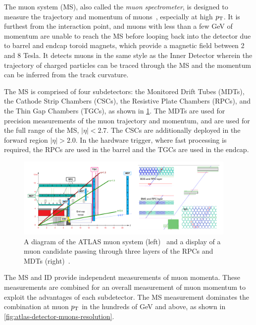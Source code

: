 The muon system (MS), also called the \textit{muon spectrometer}, is designed to measure the trajectory and momentum of muons~\cite{2010.muonspectrometer}, especially at high $p_{\mathrm{T}}$. It is furthest from the interaction point, and muons with less than a few GeV of momentum are unable to reach the MS before looping back into the detector due to barrel and endcap toroid magnets, which provide a magnetic field between 2 and 8 Tesla. It detects muons in the same style as the Inner Detector wherein the trajectory of charged particles can be traced through the MS and the momentum can be inferred from the track curvature.

The MS is comprised of four subdetectors: the Monitored Drift Tubes (MDTs), the Cathode Strip Chambers (CSCs), the Resistive Plate Chambers (RPCs), and the Thin Gap Chambers (TGCs), as shown in \cref{fig:atlas-detector-muons}. The MDTs are used for precision measurements of the muon trajectory and momentum, and are used for the full range of the MS, $|\eta| < 2.7$. The CSCs are additionally deployed in the forward region $|\eta| > 2.0$. In the hardware trigger, where fast processing is required, the RPCs are used in the barrel and the TGCs are used in the endcap.

\begin{figure}[tp]
  \centering
  \includegraphics[width=0.95\textwidth]{figures/TRIG-2012-03/fig_01_more}
  \caption{A diagram of the ATLAS muon system (left)~\cite{TRIG-2012-03} and a display of a muon candidate passing through three layers of the RPCs and MDTs (right)~\cite{atlas-eventdisplays}.}
  \label{fig:atlas-detector-muons}
\end{figure}

The MS and ID provide independent measurements of muon momenta. These measurements are combined for an overall measurement of muon momentum to exploit the advantages of each subdetector. The MS measurement dominates the combination at muon $p_{\mathrm{T}}$ in the hundreds of GeV and above, as shown in \cref{fig:atlas-detector-muons-resolution}.

